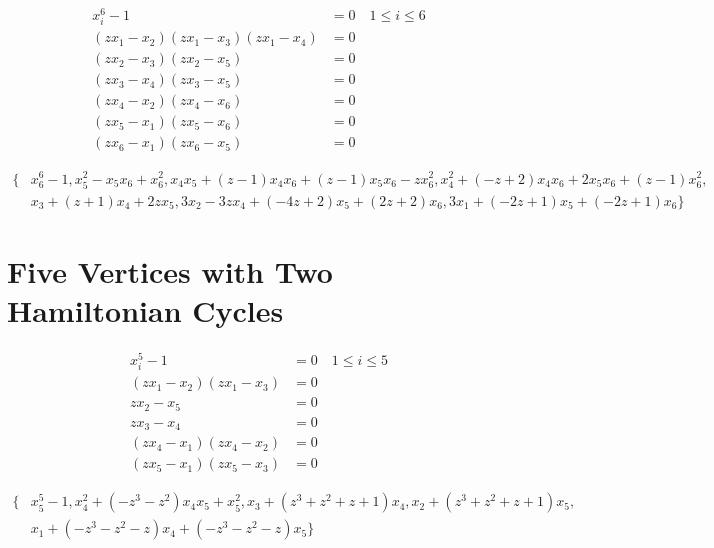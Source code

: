 \documentclass[letterpaper]{article}
\newcommand{\aln}[1]{\begin{align*} #1 \end{align*}} %
\begin{document}
\aln{
  x_i^6 - 1 &= 0 \quad 1 \leq i \leq 6\\
  (z x_1 - x_2) (z x_1 - x_3) (z x_1 - x_4) &= 0\\
  (z x_2 - x_3) (z x_2 - x_5) &= 0\\
  (z x_3 - x_4) (z x_3 - x_5) &= 0\\
  (z x_4 - x_2) (z x_4 - x_6) &= 0\\
  (z x_5 - x_1) (z x_5 - x_6) &= 0\\
  (z x_6 - x_1) (z x_6 - x_5) &= 0
}

\aln{
  \{& x_6^6-1, x_5^2-x_5x_6+x_6^2, x_4x_5+(z-1)x_4x_6+(z-1)x_5x_6-zx_6^2, x_4^2+(-z+2)x_4x_6+2x_5x_6+(z-1)x_6^2,\\& x_3+(z+1)x_4+2zx_5, 3x_2-3zx_4+(-4z+2)x_5+(2z+2)x_6, 3x_1+(-2z+1)x_5+(-2z+1)x_6\}
}

\newpage

\section{Five Vertices with Two Hamiltonian Cycles}
\begin{center}
\end{center}

\aln{
  x_i^5 - 1 &= 0 \quad 1 \leq i \leq 5\\
  (z x_1 - x_2) (z x_1 - x_3) &= 0\\
  z x_2 - x_5 &= 0\\
  z x_3 - x_4 &= 0\\
  (z x_4 - x_1) (z x_4 - x_2) &= 0\\
  (z x_5 - x_1) (z x_5 - x_3) &= 0
}

\aln{
  \{& x_5^5-1, x_4^2+(-z^3-z^2)x_4x_5+x_5^2, x_3+(z^3+z^2+z+1)x_4, x_2+(z^3+z^2+z+1)x_5,\\& x_1+(-z^3-z^2-z)x_4+(-z^3-z^2-z)x_5\}
}

\newpage
\end{document}
